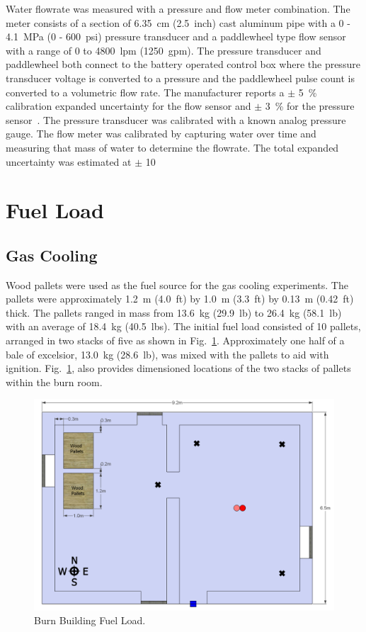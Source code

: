 \documentclass[12pt,oneside]{book}
\begin{document}
Water flowrate was measured with a pressure and flow meter combination. The meter consists of a section of 6.35~cm (2.5~inch) cast aluminum pipe with a 0 - 4.1~MPa (0 - 600~psi) pressure transducer and a paddlewheel type flow sensor with a range of 0 to 4800~lpm (1250~gpm). The pressure transducer and paddlewheel both connect to the battery operated control box where the pressure transducer voltage is converted to a pressure and the paddlewheel pulse count is converted to a volumetric flow rate.  The manufacturer reports a $\pm$ 5~\% calibration expanded uncertainty for the flow sensor and $\pm$ 3~\%  for the pressure sensor~\cite{Akron:2009}. The pressure transducer was calibrated with a known analog pressure gauge. The flow meter was calibrated by capturing water over time and measuring that mass of water to determine the flowrate. The total expanded uncertainty was estimated at $\pm$ 10 %

\section{Fuel Load}
\label{sec:fuel_load}

\subsection{Gas Cooling}
\label{sec:Fuel_Load_Gas_Cooling}

Wood pallets were used as the fuel source for the gas cooling experiments. The pallets were approximately 1.2~m (4.0~ft) by 1.0~m (3.3~ft) by 0.13~m (0.42~ft) thick. The pallets ranged in mass from 13.6~kg (29.9~lb) to 26.4~kg (58.1~lb) with an average of 18.4~kg (40.5~lbs). The initial fuel load consisted of 10 pallets, arranged in two stacks of five as shown in Fig.~\ref{fig:Burn_Building_Fuel_Load}. Approximately one half of a bale of excelsior, 13.0~kg (28.6~lb), was mixed with the pallets to aid with ignition. Fig.~\ref{fig:Burn_Building_Fuel_Load}, also provides dimensioned locations of the two stacks of pallets within the burn room.

\begin{figure}[!ht]
	\includegraphics[width=6in]{../Figures/Pictures/DelCoBurnBuildingFuelLoad}
	\caption{Burn Building Fuel Load.}
	\label{fig:Burn_Building_Fuel_Load}
\end{figure}
\end{document}
